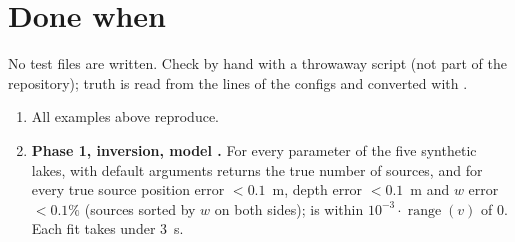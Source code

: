 \documentclass{article}
\begin{document}
\section{Done when}
\label{sec:done}

No test files are written. Check by hand with a throwaway script (not part of the
repository); truth is read from the  lines of the configs and
converted with .

\begin{enumerate}
\item All examples above reproduce.
\item \textbf{Phase 1, inversion, model .} For every parameter of the
      five synthetic lakes,  with default arguments returns the
      true number of sources, and for every true source position error
      $<0.1$~m, depth error $<0.1$~m and $w$ error $<0.1\%$ (sources sorted by
      $w$ on both sides);  is within $10^{-3}\cdot\operatorname{range}(v)$
      of 0. Each fit takes under 3~s.


\end{enumerate}
\end{document}
